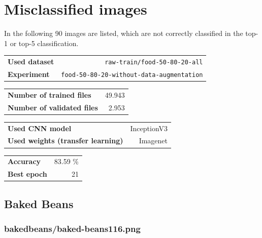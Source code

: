 
\section{Misclassified images}


        In the following 90 images are listed, which are not correctly classified in
        the top-1 or top-5 classification.
    \\

\raggedright
\begin{tabularx}{\textwidth}{X r}
    \textbf{Used dataset} & \texttt{raw-train/food-50-80-20-all}\\
    \textbf{Experiment} & \texttt{food-50-80-20-without-data-augmentation}
\end{tabularx}

\raggedright
\vspace{6pt}
\begin{tabularx}{\textwidth}{X r}
    \textbf{Number of trained files} & 49.943\\
    \textbf{Number of validated files} & 2.953
\end{tabularx}

\raggedright
\vspace{6pt}
\begin{tabularx}{\textwidth}{X r}
    \textbf{Used CNN model} & InceptionV3\\
    \textbf{Used weights (transfer learning)} & Imagenet
\end{tabularx}

\raggedright
\vspace{6pt}
\begin{tabularx}{\textwidth}{X r}
    \textbf{Accuracy} & 83.59 \%\\
    \textbf{Best epoch} & 21
\end{tabularx}
    
\subsection{Baked Beans}
    
\subsubsection{baked\textunderscore beans/baked-beans116.png}


